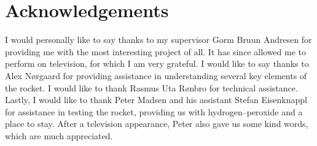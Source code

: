 \chapter{Acknowledgements}


I would personally like to say thanks to my supervisor Gorm Bruun Andresen for providing me with the most interesting project of all. It has since allowed me to perform on television, for which I am very grateful. I would like to say thanks to Alex Nørgaard for providing assistance in understanding several key elements of the rocket. I would like to thank Rasmus Uta Rønbro for technical assistance. Lastly, I would like to thank Peter Madsen and his assistant Stefan Eisenknappl for assistance in testing the rocket, providing us with hydrogen--peroxide and a place to stay. After a television appearance, Peter also gave us some kind words, which are much appreciated.
